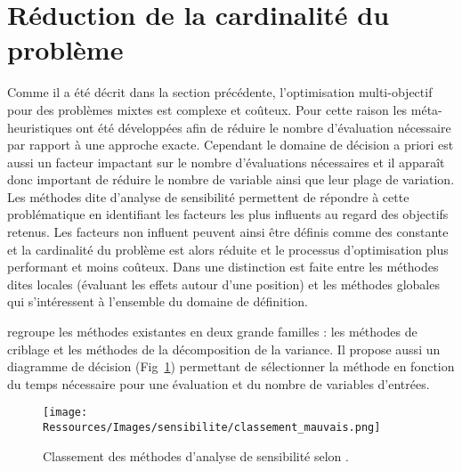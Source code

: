 \section{Réduction de la cardinalité du problème} %
\label{sec:reduction_de_la_cardinalite_du_probleme}


Comme il a été décrit dans la section précédente, l’optimisation multi-objectif pour
des problèmes mixtes est complexe et coûteux. Pour cette raison les méta-heuristiques
ont été développées afin de réduire le nombre d’évaluation nécessaire par rapport à
une approche exacte.
Cependant le domaine de décision a priori est aussi un facteur impactant sur le
nombre d’évaluations nécessaires et il apparaît donc important de réduire le nombre
de variable ainsi que leur plage de variation.
Les méthodes dite d’analyse de sensibilité permettent de répondre à cette problématique
en identifiant les facteurs les plus influents au regard des objectifs retenus.
Les facteurs non influent peuvent ainsi être définis comme des constante et la cardinalité
du problème est alors réduite et le processus d’optimisation plus performant et moins coûteux.
Dans \cite{Iooss2011} une distinction est faite entre les méthodes dites locales
(évaluant les effets autour d’une position) et les méthodes globales qui
s’intéressent à l’ensemble du domaine de définition.

\cite{Iooss2011} regroupe les méthodes existantes en deux grande familles : les
méthodes de criblage et les méthodes de la décomposition de la variance. Il propose
aussi un diagramme de décision (Fig~\ref{fig:classement_methode}) permettant de
sélectionner la méthode en fonction du temps nécessaire pour une évaluation et
du nombre de variables d’entrées.

\begin{figure}
    \begin{center}
        \texttt{[image: Ressources/Images/sensibilite/classement\_mauvais.png]}
    \end{center}
    \caption{Classement des méthodes d’analyse de sensibilité selon \cite{Iooss2011}.
             \label{fig:classement_methode}}
\end{figure}


